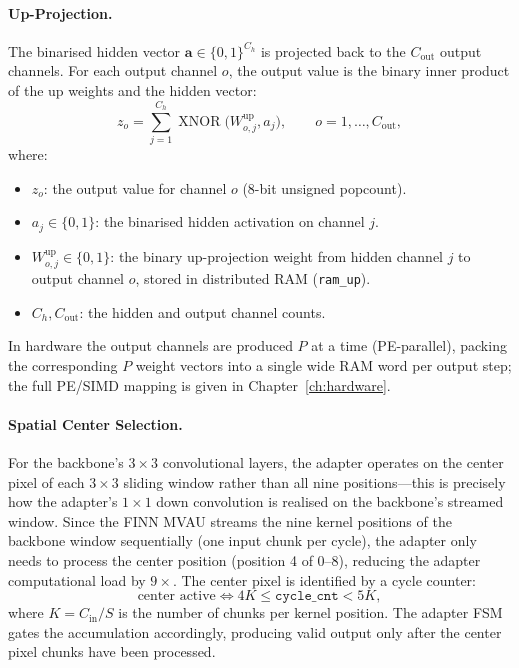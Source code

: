 \documentclass[12pt, a4paper]{report}
\numberwithin{equation}{chapter}
\numberwithin{figure}{chapter}
\numberwithin{table}{chapter}
\numberwithin{algorithm}{chapter}
\begin{document}
\paragraph{Up-Projection.} The binarised hidden vector $\mathbf{a} \in \{0,1\}^{C_h}$ is projected back to the $C_{\text{out}}$ output channels. For each output channel $o$, the output value is the binary inner product of the up weights and the hidden vector:
\begin{equation}
z_o = \sum_{j=1}^{C_h} \operatorname{XNOR}\bigl(W^{\text{up}}_{o,j}, a_j\bigr), \qquad o = 1, \ldots, C_{\text{out}},
\label{eq:up_proj}
\end{equation}
where:
\begin{itemize}
    \item $z_o$: the output value for channel $o$ (8-bit unsigned popcount).
    \item $a_j \in \{0,1\}$: the binarised hidden activation on channel $j$.
    \item $W^{\text{up}}_{o,j} \in \{0,1\}$: the binary up-projection weight from hidden channel $j$ to output channel $o$, stored in distributed RAM (\texttt{ram\_up}).
    \item $C_h, C_{\text{out}}$: the hidden and output channel counts.
\end{itemize}

In hardware the output channels are produced $P$ at a time (PE-parallel), packing the corresponding $P$ weight vectors into a single wide RAM word per output step; the full PE/SIMD mapping is given in Chapter~\ref{ch:hardware}.

\paragraph{Spatial Center Selection.} For the backbone's $3 \times 3$ convolutional layers, the adapter operates on the center pixel of each $3 \times 3$ sliding window rather than all nine positions---this is precisely how the adapter's $1 \times 1$ down convolution is realised on the backbone's streamed window. Since the FINN MVAU streams the nine kernel positions of the backbone window sequentially (one input chunk per cycle), the adapter only needs to process the center position (position 4 of 0--8), reducing the adapter computational load by $9\times$. The center pixel is identified by a cycle counter:
\begin{equation}
\text{center active} \iff 4K \leq \texttt{cycle\_cnt} < 5K,
\end{equation}
where $K = C_{\text{in}} / S$ is the number of chunks per kernel position. The adapter FSM gates the accumulation accordingly, producing valid output only after the center pixel chunks have been processed.
\end{document}
